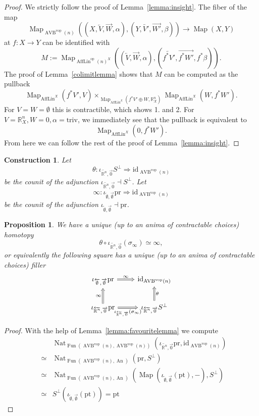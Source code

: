 \documentclass{article}
\newcommand{\R}{\mathbb{R}} %
\newcommand{\pt}{\mathrm{pt}}
\newcommand{\op}{\mathrm{op}}
\newcommand{\vop}{\mathrm{vop}}
\newcommand{\pr}{\mathrm{pr}}
\newcommand{\id}{\mathrm{id}}
\newcommand{\iotaemptyempty}{\iota_{\overleftarrow{\emptyset},\overrightarrow{\emptyset}}}
\newcommand{\iotarnzero}{\iota_{\overleftarrow{\R^n},\overrightarrow{0}}}
\DeclareMathOperator{\AVB}{AVB}
\DeclareMathOperator{\An}{An}
\DeclareMathOperator{\Fun}{Fun}
\DeclareMathOperator{\AffLin}{AffLin}
\DeclareMathOperator{\Map}{Map}
\DeclareMathOperator{\Nat}{Nat}
\newtheorem{proposition}{Proposition}
\newtheorem{construction}{Construction}
\begin{document}
\begin{proof}
    We strictly follow the proof of Lemma~\ref{lemma:insight}.
    The fiber of the map 
    \[
    \Map_{\AVB^\vop(n)}((X,\overleftarrow{V},\overrightarrow{W}, \alpha), (Y,\overleftarrow{V'},\overrightarrow{W'},\beta)) \to \Map(X,Y)   
    \]
    at $f \colon X \to Y$ can be identified with 
    \[
    M := \Map_{\AffLin^\op(n)^X}((\overleftarrow{V},\overrightarrow{W}, \alpha), (\overleftarrow{f^*V'},\overrightarrow{f^*W'},f^*\beta)).
    \]
    The proof of Lemma~\ref{colimitlemma} shows that $M$ can be computed as the pullback 
    \[
      \Map_{\AffLin^X}(f^*V', V) \times_{\Map_{\AffLin^X}(f^*V' \oplus W, \R^n_X)} \Map_{\AffLin^X}(W,f^*W').
    \] 
    For $V = W = \emptyset$ this is contractible, which shows 1. and 2.
    For $V = \R^n_X, W = 0, \alpha = \mathrm{triv}$, we immediately see that the pullback is equivalent to 
    \[
      \Map_{\AffLin^X}(0,f^*W').  
    \]
    From here we can follow the rest of the proof of Lemma~\ref{lemma:insight}.
\end{proof}

\begin{construction}
    Let
    \[
        \theta \colon \iotarnzero S^\perp \Rightarrow \id_{\AVB^\vop(n)}    
    \]
    be the counit of the adjunction 
    $\iotarnzero \dashv S^\perp$. 
    Let 
    \[
      \infty \colon \iotaemptyempty \pr \Rightarrow \id_{\AVB^\vop(n)}  
    \]
    be the counit of the adjunction 
    $\iotaemptyempty \dashv \pr$.
\end{construction}

\begin{proposition}
    We have a unique (up to an anima of contractable choices) homotopy
    \[
      \theta \circ \iotarnzero(\sigma_\infty) \simeq \infty , 
    \]
    or equivalently the following square has a unique (up to an anima of contractable choices) filler 
    \[\begin{tikzcd}
        {\iotaemptyempty \pr} & {\id_{\AVB^\vop(n)}} \\
        {\iotarnzero \pr} & {\iotarnzero S^\perp}
        \arrow["{\iotarnzero(\sigma_\infty)}"', Rightarrow, from=2-1, to=2-2]
        \arrow["\theta"', Rightarrow, from=2-2, to=1-2]
        \arrow["\infty", Rightarrow, from=2-1, to=1-1]
        \arrow["\infty", Rightarrow, from=1-1, to=1-2]
    \end{tikzcd}\label{diag:AVB(n)square}\]\label{prop: thomatinftyinavb(n)}
\end{proposition}
\begin{proof}
    With the help of Lemma~\ref{lemma:favouritelemma} we compute 
    \begin{eqnarray*}
        & & \Nat_{\Fun(\AVB^\vop(n), \AVB^\vop(n))}(\iotarnzero \pr, \id_{\AVB^\vop(n)}) \\ 
        & \simeq & \Nat_{\Fun(\AVB^\vop(n), \An)}(\pr, S^\perp)\\
        & \simeq & \Nat_{\Fun(\AVB^\vop(n), \An)}(\Map(\iotaemptyempty(\pt), -), S^\perp) \\
        & \simeq & S^\perp( \iotaemptyempty(\pt)) = \pt 
    \end{eqnarray*}
\end{proof}
\end{document}
